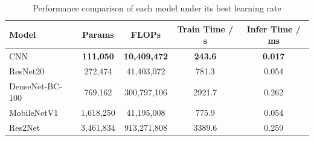 \begin{table}[htbp]
\centering
\caption{Performance comparison of each model under its best learning rate}
\begin{tabular}{lcccc}
\toprule
Model & Params & FLOPs & Train Time / s & Infer Time / ms \\
\midrule
CNN & \textbf{111,050} & \textbf{10,409,472} & \textbf{243.6} & \textbf{0.017} \\
ResNet20 & 272,474 & 41,403,072 & 781.3 & 0.054 \\
DenseNet-BC-100 & 769,162 & 300,797,106 & 2921.7 & 0.262 \\
MobileNetV1 & 1,618,250 & 41,195,008 & 775.9 & 0.054 \\
Res2Net & 3,461,834 & 913,271,808 & 3389.6 & 0.259 \\
\bottomrule
\end{tabular}
\label{tab:model_compare}
\end{table}